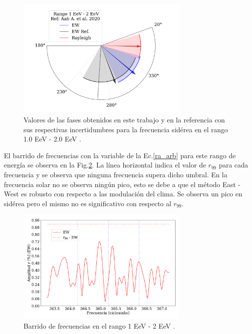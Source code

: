     \begin{figure}[H]
        \begin{small}
            \begin{center}
                \includegraphics[width=0.75\textwidth]{phase_tercer_bin_v2.pdf}
            \end{center}
        \caption{Valores de las fases obtenidos en este trabajo y en la referencia con sus respectivas incertidumbres para la frecuencia sidérea en el  rango 1.0 EeV - 2.0 EeV .}
        \label{fig:tercer}
        \end{small}
    \end{figure}


    El barrido de frecuencias con la variable de la Ec.\ref{ra_arb} para este rango de energía se observa en la Fig.\ref{fig:tercer_barrido}. La línea horizontal indica el valor de $r_{99}$ para cada frecuencia y se observa que ninguna frecuencia supera dicho umbral. En la frecuencia solar no se observa ningún pico, esto se debe a que el método East - West es robusto con respecto a las modulación del clima. Se observa un pico en sidérea pero el mismo no es significativo con respecto al $r_{99}$.


    \begin{figure}[H]
        \begin{small}
            \begin{center}
                \includegraphics[width=0.75\textwidth]{plot_bin_3_barrido_v3_EW.pdf}
            \end{center}
            \caption{Barrido de frecuencias en el rango 1 EeV - 2 EeV .}
            \label{fig:tercer_barrido}
        \end{small}
    \end{figure}    

